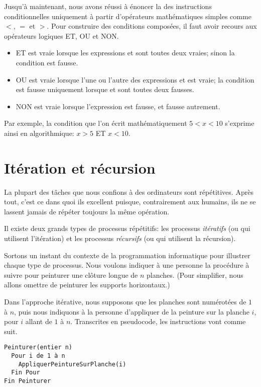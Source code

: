 Jusqu'à maintenant, nous avons réussi à énoncer la 
des instructions conditionnelles uniquement à partir d'opérateurs
mathématiques simples comme $<$, $=$ et $>$. Pour construire des
conditions composées, il faut avoir recours aux opérateurs logiques
ET, OU et NON.
\begin{itemize}
\item {} ET  est vraie lorsque les expressions
   et  sont toutes deux vraies; sinon la
  condition est fausse.
\item {} OU  est vraie lorsque l'une ou l'autre
  des expressions  et  est vraie; la condition
  est fausse uniquement lorsque  et  sont
  toutes deux fausses.
\item NON  est vraie lorsque l'expression  est fausse,
  et fausse autrement.
\end{itemize}

Par exemple, la condition que l'on écrit mathématiquement $5 < x < 10$
s'exprime ainsi en algorithmique: $x > 5$ ET $x < 10$.


\section{Itération et récursion}
\label{sec:algorithmes:iteration}

La plupart des tâches que nous confions à des ordinateurs sont
répétitives. Après tout, c'est ce dans quoi ils excellent puisque,
contrairement aux humains, ils ne se lassent jamais de répéter
toujours la même opération.

Il existe deux grands types de processus répétitifs: les processus
\emph{itératifs} (ou qui utilisent
l'itération) et les processus
\emph{récursifs} (ou qui utilisent la
récursion).

Sortons un instant du contexte de la programmation informatique pour
illustrer chaque type de processus. Nous voulons indiquer à une
personne la procédure à suivre pour peinturer une clôture longue de
$n$ planches. (Pour simplifier, nous allons omettre de peinturer les
supports horizontaux.)

Dans l'approche itérative, nous supposons que les planches sont
numérotées de $1$ à $n$, puis nous indiquons à la personne d'appliquer
de la peinture sur la planche $i$, pour $i$ allant de $1$ à $n$.
Transcrites en pseudocode, les instructions vont comme suit.
\begin{Schunk}
\begin{Verbatim}
Peinturer(entier n)
  Pour i de 1 à n
    AppliquerPeintureSurPlanche(i)
  Fin Pour
Fin Peinturer
\end{Verbatim}
\end{Schunk}


